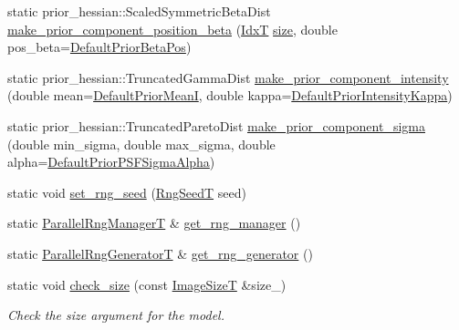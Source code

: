 \begin{DoxyCompactItemize}
\item 
static prior\+\_\+hessian\+::\+Scaled\+Symmetric\+Beta\+Dist \hyperlink{classmappel_1_1PointEmitterModel_a1f6f12bdf0e6fc374bf217172fc0ccef}{make\+\_\+prior\+\_\+component\+\_\+position\+\_\+beta} (\hyperlink{namespacemappel_ab17ec0f30b61ece292439d7ece81d3a8}{IdxT} \hyperlink{classmappel_1_1ImageFormat2DBase_a3be77d2aa6ec9f3815322732950c2a60}{size}, double pos\+\_\+beta=\hyperlink{classmappel_1_1PointEmitterModel_a2771dc4415f351862619cd9671b5310d}{Default\+Prior\+Beta\+Pos})
\item 
static prior\+\_\+hessian\+::\+Truncated\+Gamma\+Dist \hyperlink{classmappel_1_1PointEmitterModel_a41deeb728d8fae68ca474e97ea73d429}{make\+\_\+prior\+\_\+component\+\_\+intensity} (double mean=\hyperlink{classmappel_1_1PointEmitterModel_a607fcdea787b0cc3c6ac8804d378d1b1}{Default\+Prior\+MeanI}, double kappa=\hyperlink{classmappel_1_1PointEmitterModel_a03d9f90c130df2d42d0d31c9337e914c}{Default\+Prior\+Intensity\+Kappa})
\item 
static prior\+\_\+hessian\+::\+Truncated\+Pareto\+Dist \hyperlink{classmappel_1_1PointEmitterModel_a7506af8d9e430e63a56972eb64709fca}{make\+\_\+prior\+\_\+component\+\_\+sigma} (double min\+\_\+sigma, double max\+\_\+sigma, double alpha=\hyperlink{classmappel_1_1PointEmitterModel_a2b06111eaa1ff284851c2e67a3827220}{Default\+Prior\+P\+S\+F\+Sigma\+Alpha})
\item 
static void \hyperlink{classmappel_1_1PointEmitterModel_a046d5bd901c8dfde61f082c2634beec0}{set\+\_\+rng\+\_\+seed} (\hyperlink{namespacemappel_a318bca259a7add5979160939a3f4e60b}{Rng\+SeedT} seed)
\item 
static \hyperlink{namespacemappel_acf276a4212f07b1ed4cb2ddce379ba1d}{Parallel\+Rng\+ManagerT} \& \hyperlink{classmappel_1_1PointEmitterModel_ae876f0fa81613161a064452973bfb558}{get\+\_\+rng\+\_\+manager} ()
\item 
static \hyperlink{namespacemappel_ad1e99b214465229065d30f881a89d1cc}{Parallel\+Rng\+GeneratorT} \& \hyperlink{classmappel_1_1PointEmitterModel_af9f6630e9d496bb83e151f00522ecc2d}{get\+\_\+rng\+\_\+generator} ()
\item 
static void \hyperlink{classmappel_1_1ImageFormat2DBase_a9c90f6a165348629be4bcf956e3010f3}{check\+\_\+size} (const \hyperlink{classmappel_1_1ImageFormat2DBase_a49cccf61eb2a768a202634d27fcd81d5}{Image\+SizeT} \&size\+\_\+)
\begin{DoxyCompactList}\small\item\em Check the size argument for the model. \end{DoxyCompactList}\end{DoxyCompactItemize}
